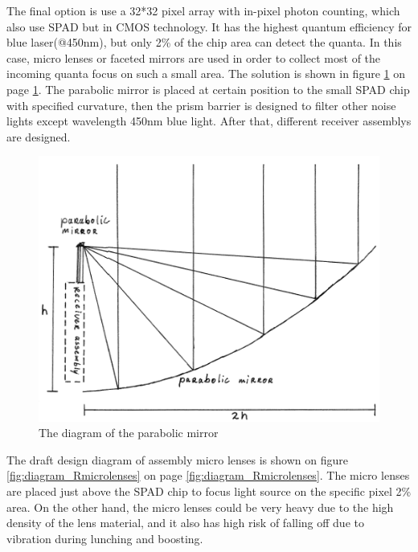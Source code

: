 The final option is use a 32*32 pixel array with in-pixel photon counting, which also use \acs{SPAD} but in \ac{CMOS} technology. It has the highest quantum efficiency for blue laser(@450nm), but only 2\% of the chip area can detect the quanta. In this case, micro lenses or faceted mirrors are used in order to collect most of the incoming quanta focus on such a small area. The solution is shown in figure \ref{fig:diagram_Rgeneral} on page \ref{fig:diagram_Rgeneral}. The parabolic mirror is placed at certain position to the small \acs{SPAD} chip with specified curvature, then the prism barrier is designed to filter other noise lights except wavelength 450nm blue light. After that, different receiver assemblys are designed.
\begin{figure}
\centering
\includegraphics[scale = 0.6]{chapters/img/DiagramReceiverGeneral.png}
\caption{The diagram of the parabolic mirror}
\label{fig:diagram_Rgeneral}
\end{figure}
The draft design diagram of assembly micro lenses is shown on figure \ref{fig:diagram_Rmicrolenses} on page \ref{fig:diagram_Rmicrolenses}. The micro lenses are placed just above the \acs{SPAD} chip to focus light source on the specific pixel 2\% area. On the other hand, the micro lenses could be very heavy due to the high density of the lens material, and it also has high risk of falling off due to vibration during lunching and boosting.
